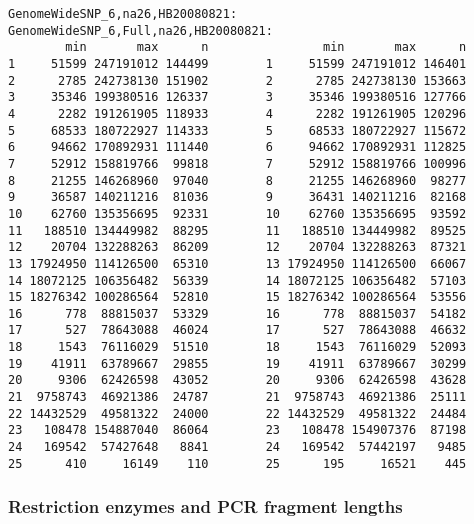 \documentclass[11pt,a4paper]{article}
\begin{document}
\clearpage
\begin{Verbatim}[fontsize=\small]
GenomeWideSNP_6,na26,HB20080821:    GenomeWideSNP_6,Full,na26,HB20080821:
        min       max      n                min       max      n
1     51599 247191012 144499        1     51599 247191012 146401
2      2785 242738130 151902        2      2785 242738130 153663
3     35346 199380516 126337        3     35346 199380516 127766
4      2282 191261905 118933        4      2282 191261905 120296
5     68533 180722927 114333        5     68533 180722927 115672
6     94662 170892931 111440        6     94662 170892931 112825
7     52912 158819766  99818        7     52912 158819766 100996
8     21255 146268960  97040        8     21255 146268960  98277
9     36587 140211216  81036        9     36431 140211216  82168
10    62760 135356695  92331        10    62760 135356695  93592
11   188510 134449982  88295        11   188510 134449982  89525
12    20704 132288263  86209        12    20704 132288263  87321
13 17924950 114126500  65310        13 17924950 114126500  66067
14 18072125 106356482  56339        14 18072125 106356482  57103
15 18276342 100286564  52810        15 18276342 100286564  53556
16      778  88815037  53329        16      778  88815037  54182
17      527  78643088  46024        17      527  78643088  46632
18     1543  76116029  51510        18     1543  76116029  52093
19    41911  63789667  29855        19    41911  63789667  30299
20     9306  62426598  43052        20     9306  62426598  43628
21  9758743  46921386  24787        21  9758743  46921386  25111
22 14432529  49581322  24000        22 14432529  49581322  24484
23   108478 154887040  86064        23   108478 154907376  87198
24   169542  57427648   8841        24   169542  57442197   9485
25      410     16149    110        25      195     16521    445
\end{Verbatim}



\subsubsection*{Restriction enzymes and PCR fragment lengths}
\end{document}
